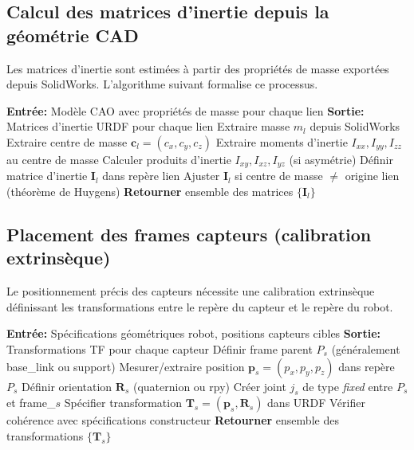 \documentclass[a4paper,12pt]{report}
\begin{document}
\subsection{Calcul des matrices d'inertie depuis la géométrie CAD}

Les matrices d'inertie sont estimées à partir des propriétés de masse exportées depuis SolidWorks. L'algorithme suivant formalise ce processus.

\begin{algorithm}[htbp]
\caption{Estimation des matrices d'inertie depuis CAD}
\label{alg:inertia_estimation}
\begin{algorithmic}[1]
\State \textbf{Entrée:} Modèle CAO avec propriétés de masse pour chaque lien
\State \textbf{Sortie:} Matrices d'inertie URDF pour chaque lien
    \State Extraire masse $m_l$ depuis SolidWorks
    \State Extraire centre de masse $\mathbf{c}_l = (c_x, c_y, c_z)$
    \State Extraire moments d'inertie $I_{xx}, I_{yy}, I_{zz}$ au centre de masse
    \State Calculer produits d'inertie $I_{xy}, I_{xz}, I_{yz}$ (si asymétrie)
    \State Définir matrice d'inertie $\mathbf{I}_l$ dans repère lien
    \State Ajuster $\mathbf{I}_l$ si centre de masse $\neq$ origine lien (théorème de Huygens)
\EndFor
\State \textbf{Retourner} ensemble des matrices $\{\mathbf{I}_l\}$
\end{algorithmic}
\end{algorithm}

\subsection{Placement des frames capteurs (calibration extrinsèque)}

Le positionnement précis des capteurs nécessite une calibration extrinsèque définissant les transformations entre le repère du capteur et le repère du robot.

\begin{algorithm}[htbp]
\caption{Algorithme de placement des frames capteurs}
\label{alg:sensor_placement}
\begin{algorithmic}[1]
\State \textbf{Entrée:} Spécifications géométriques robot, positions capteurs cibles
\State \textbf{Sortie:} Transformations TF pour chaque capteur
    \State Définir frame parent $P_s$ (généralement base\_link ou support)
    \State Mesurer/extraire position $\mathbf{p}_s = (p_x, p_y, p_z)$ dans repère $P_s$
    \State Définir orientation $\mathbf{R}_s$ (quaternion ou rpy)
    \State Créer joint $j_s$ de type \textit{fixed} entre $P_s$ et frame\_$s$
    \State Spécifier transformation $\mathbf{T}_s = (\mathbf{p}_s, \mathbf{R}_s)$ dans URDF
    \State Vérifier cohérence avec spécifications constructeur
\EndFor
\State \textbf{Retourner} ensemble des transformations $\{\mathbf{T}_s\}$
\end{algorithmic}
\end{algorithm}
\end{document}
